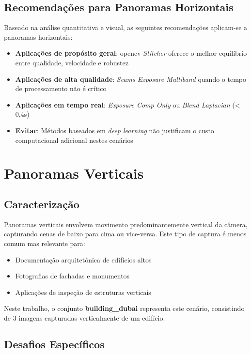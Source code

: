 \subsection{Recomendações para Panoramas Horizontais}

Baseado na análise quantitativa e visual, as seguintes recomendações aplicam-se a panoramas horizontais:

\begin{itemize}
    \item \textbf{Aplicações de propósito geral}: \gls{opencv} \textit{Stitcher} oferece o melhor equilíbrio entre qualidade, velocidade e robustez
    \item \textbf{Aplicações de alta qualidade}: \textit{Seams Exposure Multiband} quando o tempo de processamento não é crítico
    \item \textbf{Aplicações em tempo real}: \textit{Exposure Comp Only} ou \textit{Blend Laplacian} (< 0,4s)
    \item \textbf{Evitar}: Métodos baseados em \textit{deep learning} não justificam o custo computacional adicional nestes cenários
\end{itemize}

\section{Panoramas Verticais}

\subsection{Caracterização}

Panoramas verticais envolvem movimento predominantemente vertical da câmera, capturando cenas de baixo para cima ou vice-versa. Este tipo de captura é menos comum mas relevante para:

\begin{itemize}
    \item Documentação arquitetônica de edifícios altos
    \item Fotografias de fachadas e monumentos
    \item Aplicações de inspeção de estruturas verticais
\end{itemize}

Neste trabalho, o conjunto \textbf{building\_dubai} representa este cenário, consistindo de 3 imagens capturadas verticalmente de um edifício.

\subsection{Desafios Específicos}

